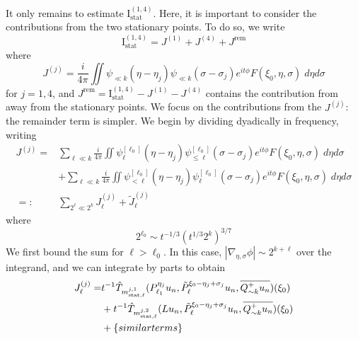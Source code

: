 \documentclass[letterpaper, reqno,final]{amsart}
\newcommand{\rmI}{\mathrm{I}}
\newcommand{\deles}{\nabla_{\eta,\sigma}}
\newcommand{\btext}[1]{\left\{\textup{#1}\right\}}
\newcommand{\bsim}{\btext{similar terms}}
\begin{document}
It only remains to estimate $\rmI^{(1,4)}_{\text{stat}}$.  Here, it is important to consider the contributions from the two stationary points.  To do so, we write
\begin{equation}
    \rmI^{(1,4)}_\text{stat} = J^{(1)} + J^{(4)} + J^{\text{rem}}
\end{equation}
where
\begin{equation*}
    J^{(j)} = \frac{i}{4\pi} \iint \psi_{\ll k}(\eta - \eta_j) \psi_{\ll k}(\sigma - \sigma_j) e^{it\phi} F(\xi_0,\eta,\sigma)\;d\eta d\sigma
\end{equation*}
for $j = 1,4$, and $J^{\text{rem}} = \rmI^{(1,4)}_{\text{stat}} - J^{(1)} - J^{(4)}$ contains the contribution from away from the stationary points.  We focus on the contributions from the $J^{(j)}$: the remainder term is simpler.  We begin by dividing dyadically in frequency, writing
\begin{equation*}\begin{split}
    J^{(j)} =& \sum_{\ell \ll k} \frac{i}{4\pi} \iint \psi^{[\ell_0]}_{\ell}(\eta - \eta_j) \psi^{[\ell_0]}_{\leq \ell}(\sigma - \sigma_j) e^{it\phi} F(\xi_0, \eta, \sigma)\;d\eta d\sigma \\
    &+ \sum_{\ell \ll k} \frac{i}{4\pi} \iint \psi^{[\ell_0]}_{< \ell}(\eta - \eta_j) \psi^{[\ell_0]}_{\ell}(\sigma - \sigma_j) e^{it\phi} F(\xi_0, \eta, \sigma)\;d\eta d\sigma \\
    =:& \sum_{2^{\ell} \ll 2^k} J^{(j)}_{\ell} + \tilde{J}^{(j)}_{\ell}
\end{split}\end{equation*}
where
\begin{equation}\label{eqn:ell-0-defn}
    2^{\ell_0} \sim t^{-1/3}(t^{1/3}2^k)^{3/7}
\end{equation}
We first bound the sum for $\ell > \ell_0$.  In this case, $|\deles \phi| \sim 2^{k + \ell}$ over the integrand, and we can integrate by parts to obtain
\begin{equation*}\begin{split}
    J^{(j)}_{\ell} %
    =& t^{-1}\hat{T}_{m^{j,1}_{\text{stat},\ell}}(P^{\eta_j}_{\ell_1}u_n, \tilde{P}^{\xi_0 - \eta_j + \sigma_j}_{\ell}u_n, \overline{Q^+_{\sim k} u_n})(\xi_0)\\
    &+ t^{-1}\hat{T}_{m^{j,2}_{\text{stat},\ell}}(L u_n, \tilde{P}^{\xi_0 - \eta_j + \sigma_j}_{\ell}u_n, \overline{Q^{+}_{\sim k}u_n})(\xi_0)\\
    &+\bsim\\
\end{split}	\end{equation*}
\end{document}
